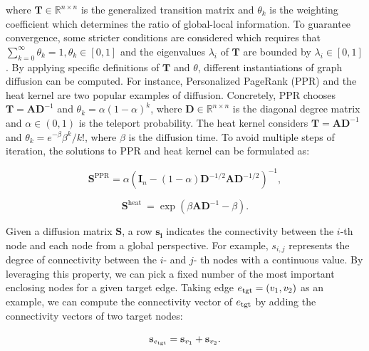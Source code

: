\documentclass[10pt,journal,compsoc]{IEEEtran}
\newcommand{\HL}{}
\newcommand{\yg}{}
\begin{document}
\noindent where $\mathbf{T} \in \mathbb{R}^{n \times n}$ is the generalized transition matrix and $\theta_{k}$ is the weighting coefficient which determines the ratio of global-local information. To guarantee convergence, some stricter conditions are considered which requires that $\sum_{k=0}^{\infty} \theta_{k}=1, \theta_{k} \in[0,1]$ and the eigenvalues $\lambda_i$ of $\mathbf{T}$ are bounded by $\lambda_i \in[0,1]$. By applying specific definitions of $\mathbf{T}$ and $\theta$, different instantiations of graph diffusion can be computed. For instance, Personalized PageRank (PPR) \cite{page1999pagerank} and the heat kernel \cite{kondor2002diffusion} are two popular examples of diffusion. Concretely, PPR chooses $\mathbf{T}=\mathbf{A} \mathbf{D}^{-1}$ and $\theta_{k}=\alpha(1-\alpha)^{k}$, where $\mathbf{D} \in \mathbb{R}^{n \times n}$ is the diagonal degree matrix and $\alpha \in (0,1)$ is the teleport probability. The heat kernel considers $\mathbf{T}=\mathbf{A} \mathbf{D}^{-1}$ and $\theta_{k}=e^{-\beta} \beta^{k} / k !$, \HL{where $\beta$ is the diffusion time}. To avoid multiple steps of iteration, the \yg{solutions to PPR and heat kernel can be} formulated as:

\begin{equation}
\label{eq:ppr}
\mathbf{S}^{\mathrm{PPR}}=\alpha\left(\mathbf{I}_{n}-(1-\alpha) \mathbf{D}^{-1 / 2} \mathbf{A} \mathbf{D}^{-1 / 2}\right)^{-1},
\end{equation}

\begin{equation}
\label{eq:heat}
\mathbf{S}^{\text {heat }}=\exp \left(\beta \mathbf{A} \mathbf{D}^{-1}- \beta \right).
\end{equation}

Given a diffusion matrix $\mathbf{S}$, a row $\mathbf{s_i}$ indicates the connectivity between the $i$-th node and each node from a global perspective. For example, $s_{i,j}$ represents the degree of connectivity between the $i$- and $j$- th nodes with a continuous value. By leveraging \HL{this} property, we can pick a fixed number of the most important enclosing nodes for a given target edge. Taking edge $e_{\rm tgt} = (v_1,v_2)$ as an example, we can compute the connectivity vector of $e_{\rm tgt}$ by adding the connectivity vectors of two target nodes:

\begin{equation}
\label{eq:edge_com}
\mathbf{s}_{e_{\rm tgt}}= \mathbf{s}_{v_1} + \mathbf{s}_{v_2}.
\end{equation}
\end{document}
